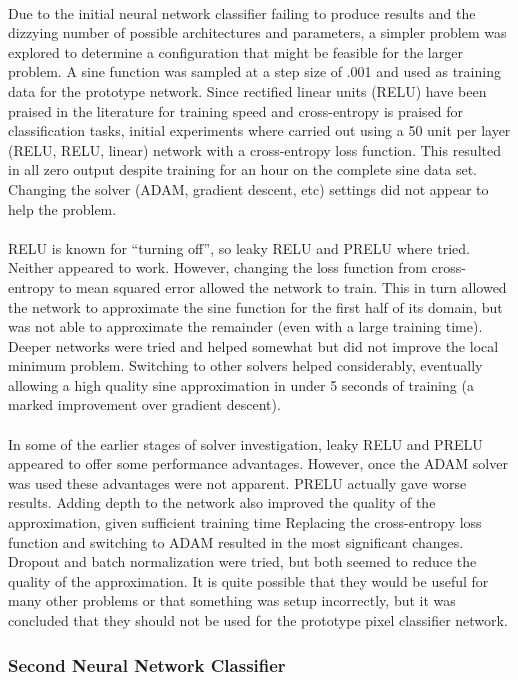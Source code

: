 \documentclass[12pt]{article}
\begin{document}
\\
	Due to the initial neural network classifier failing to produce results and the dizzying number of possible architectures and parameters, a simpler problem was explored to determine a configuration that might be feasible for the larger problem.  A sine function was sampled at a step size of .001 and used as training data for the prototype network.  Since rectified linear units (RELU) have been praised in the literature for training speed and cross-entropy is praised for classification tasks, initial experiments where carried out using a 50 unit per layer (RELU, RELU, linear) network with a cross-entropy loss function.  This resulted in all zero output despite training for an hour on the complete sine data set.  Changing the solver (ADAM, gradient descent, etc) settings did not appear to help the problem.\\
\\
	RELU is known for “turning off”, so leaky RELU and PRELU where tried.  Neither appeared to work.  However, changing the loss function from cross-entropy to mean squared error allowed the network to train.  This in turn allowed the network to approximate the sine function for the first half of its domain, but was not able to approximate the remainder (even with a large training time).  Deeper networks were tried and helped somewhat but did not improve the local minimum problem.  Switching to other solvers helped considerably, eventually allowing a high quality sine approximation in under 5 seconds of training (a marked improvement over gradient descent).\\
\\
	In some of the earlier stages of solver investigation, leaky RELU and PRELU appeared to offer some performance advantages. However, once the ADAM solver was used these advantages were not apparent. PRELU actually gave worse results.  Adding depth to the network also improved the quality of the approximation, given sufficient training time Replacing the cross-entropy loss function and switching to ADAM resulted in the most significant changes.  Dropout and batch normalization were tried, but both seemed to reduce the quality of the approximation.  It is quite possible that they would be useful for many other problems or that something was setup incorrectly, but it was concluded that they should not be used for the prototype pixel classifier network.\\

\subsubsection{Second Neural Network Classifier}
\end{document}
